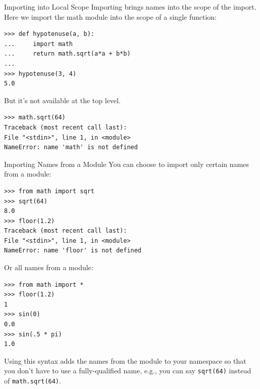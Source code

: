 \documentclass[smaller, aspectratio=1610]{beamer}
\begin{document}
\begin{frame}[label={sec:orgb9b9e5d},fragile]{Importing into Local Scope}
 Importing brings names into the scope of the import.  Here we import the math module into the scope of a single function:

\lstset{language=Python,label= ,caption= ,captionpos=b,numbers=none}
\begin{lstlisting}
>>> def hypotenuse(a, b):
...     import math
...     return math.sqrt(a*a + b*b)
...
>>> hypotenuse(3, 4)
5.0
\end{lstlisting}

But it's not available at the top level.

\lstset{language=Python,label= ,caption= ,captionpos=b,numbers=none}
\begin{lstlisting}
>>> math.sqrt(64)
Traceback (most recent call last):
File "<stdin>", line 1, in <module>
NameError: name 'math' is not defined
\end{lstlisting}
\end{frame}

\begin{frame}[label={sec:org5623832},fragile]{Importing Names from a Module}
 You can choose to import only certain names from a module:

\lstset{language=Python,label= ,caption= ,captionpos=b,numbers=none}
\begin{lstlisting}
>>> from math import sqrt
>>> sqrt(64)
8.0
>>> floor(1.2)
Traceback (most recent call last):
File "<stdin>", line 1, in <module>
NameError: name 'floor' is not defined
\end{lstlisting}

Or all names from a module:

\lstset{language=Python,label= ,caption= ,captionpos=b,numbers=none}
\begin{lstlisting}
>>> from math import *
>>> floor(1.2)
1
>>> sin(0)
0.0
>>> sin(.5 * pi)
1.0
\end{lstlisting}

Using this syntax adds the names from the module to your namespace so that you don't have to use a fully-qualified name, e.g., you can say \texttt{sqrt(64)} instead of \texttt{math.sqrt(64)}.
\end{frame}
\end{document}
